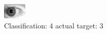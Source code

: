 \begin{figure}[h!]
\begin{center}
\includegraphics[width=0.60\columnwidth]{figures/ID218_class_4_target_3.png}
\end{center}
\caption{ Classification: 4 actual target: 3}
\label{fig:ID218_class_4_target_3}
\end{figure}
